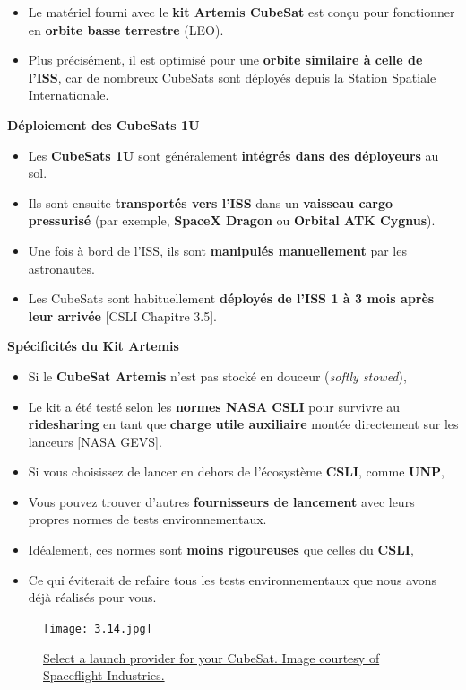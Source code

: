 \begin{itemize}
    \item Le matériel fourni avec le \textbf{kit Artemis CubeSat} est conçu pour fonctionner en \textbf{orbite basse terrestre} (LEO).
    \item Plus précisément, il est optimisé pour une \textbf{orbite similaire à celle de l’ISS}, car de nombreux CubeSats sont déployés depuis la Station Spatiale Internationale.
\end{itemize}
\textbf{Déploiement des CubeSats 1U}

\begin{itemize}
    \item Les \textbf{CubeSats 1U} sont généralement \textbf{intégrés dans des déployeurs} au sol.
    \item Ils sont ensuite \textbf{transportés vers l’ISS} dans un \textbf{vaisseau cargo pressurisé} (par exemple, \textbf{SpaceX Dragon} ou \textbf{Orbital ATK Cygnus}).
    \item Une fois à bord de l’ISS, ils sont \textbf{manipulés manuellement} par les astronautes.
    \item Les CubeSats sont habituellement \textbf{déployés de l’ISS 1 à 3 mois après leur arrivée} [CSLI Chapitre 3.5].
\end{itemize}

\textbf{Spécificités du Kit Artemis}
\begin{itemize}
    \item Si le \textbf{CubeSat Artemis} n’est pas stocké en douceur (\textit{softly stowed}), 
    \item Le kit a été testé selon les \textbf{normes NASA CSLI} pour survivre au \textbf{ridesharing} en tant que \textbf{charge utile auxiliaire} montée directement sur les lanceurs [NASA GEVS].
\end{itemize}

\begin{itemize}
    \item Si vous choisissez de lancer en dehors de l'écosystème \textbf{CSLI}, comme \textbf{UNP},  
    \item Vous pouvez trouver d'autres \textbf{fournisseurs de lancement} avec leurs propres normes de tests environnementaux.
    \item Idéalement, ces normes sont \textbf{moins rigoureuses} que celles du \textbf{CSLI}, 
    \item Ce qui éviterait de refaire tous les tests environnementaux que nous avons déjà réalisés pour vous.
\end{itemize}
\begin{figure}[H] %
    \centering
    \texttt{[image: 3.14.jpg]}
    \caption\href{https://blog.satsearch.co/2019-12-04-find-a-launch-option-for-your-cubesat-or-small-satellite-an-overview-of-launch-service-providers}{Select a launch provider for your CubeSat. Image courtesy of Spaceflight Industries.}
    \label{fig:communication2}
\end{figure}
